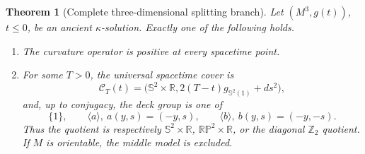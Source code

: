 \documentclass[10pt]{coll-l}
\newcommand{\R}{\mathbb{R}}
\newcommand{\Sph}{\mathbb{S}}
\newtheorem{theorem}{Theorem}[chapter]
\theoremstyle{definition}
\theoremstyle{remark}
\numberwithin{section}{chapter}
\numberwithin{equation}{chapter}
\begin{document}
\begin{theorem}[Complete three-dimensional splitting branch]
\label{thm:ksol-three-dimensional-split-branch}
Let $(M^3,g(t))$, $t\leq0$, be an ancient $\kappa$-solution.  Exactly one of
the following holds.
\begin{enumerate}
\item The curvature operator is positive at every spacetime point.
\item For some $T>0$, the universal spacetime cover is
\begin{equation}
 \mathcal C_T(t)=
 \bigl(\Sph^2\times\R,
       2(T-t)g_{\Sph^2(1)}+ds^2\bigr),                \label{eq:ksol-cylinder-cover}
\end{equation}
and, up to conjugacy, the deck group is one of
\begin{equation}
 \{1\},\qquad
 \langle a\rangle,\ a(y,s)=(-y,s),\qquad
 \langle b\rangle,\ b(y,s)=(-y,-s).                  \label{eq:ksol-cylinder-deck-list}
\end{equation}
Thus the quotient is respectively $\Sph^2\times\R$,
$\mathbb{RP}^2\times\R$, or the diagonal $\mathbb Z_2$ quotient.  If $M$
is orientable, the middle model is excluded.
\end{enumerate}
\end{theorem}
\end{document}
